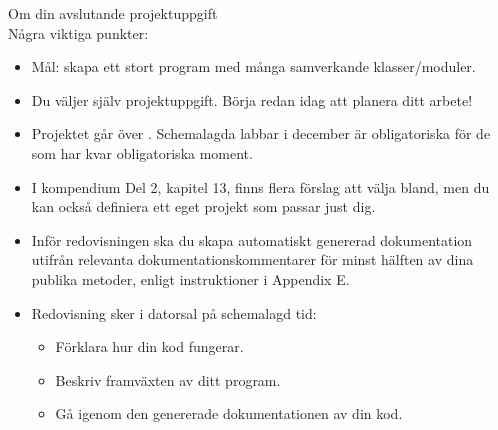 



\begin{Slide}{Om din avslutande projektuppgift}\SlideFontSmall
{} \\
Några viktiga punkter:
\begin{itemize}
\item Mål: skapa ett stort program med många samverkande klasser/moduler.
\item Du väljer själv projektuppgift. Börja redan idag att planera ditt arbete!
\item Projektet går över . Schemalagda labbar i december är obligatoriska för de som har kvar obligatoriska moment.

\item I kompendium Del 2, kapitel 13, finns flera förslag att välja bland, men du kan också definiera ett eget projekt som passar just dig.


\item Inför redovisningen ska du skapa automatiskt genererad dokumentation utifrån relevanta dokumentationskommentarer för minst hälften av dina publika metoder, enligt instruktioner i Appendix E.

\item Redovisning sker i datorsal på schemalagd tid:
\begin{itemize}\SlideFontTiny
  \item Förklara hur din kod fungerar.
  \item Beskriv framväxten av ditt program.
  \item Gå igenom den genererade dokumentationen av din kod.
\end{itemize}
\end{itemize}

\end{Slide}

